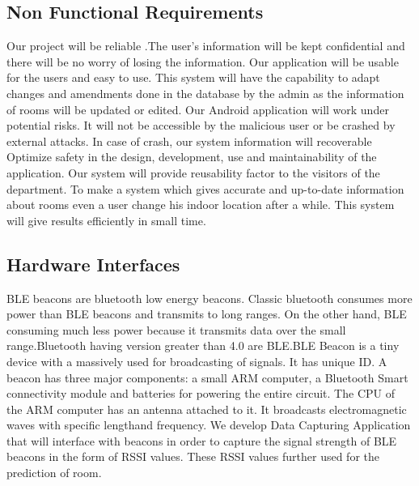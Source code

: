 \documentclass{article}
\begin{document}
\subsection{Non Functional Requirements}
Our project will be reliable .The user’s information will be kept confidential and there will be no worry of losing the information.
Our application will be usable for the users and easy to use.
This system will have the capability to adapt changes and amendments done in the database by the admin as the information of rooms will be updated or edited.
Our Android application will work under potential risks. It will not be accessible by the malicious user or be crashed by external attacks.
In case of crash, our system information will recoverable
Optimize safety in the design, development, use and maintainability of the application.
Our system will provide reusability factor to the visitors of the department.
To make a system which gives accurate and up-to-date information about rooms even a user change his indoor location after a while. This system will give results efficiently in small time.


\subsection{Hardware Interfaces}
BLE beacons are bluetooth low energy beacons. Classic bluetooth consumes more power than BLE beacons and 
transmits to long ranges. On the other hand, BLE consuming much less power because it transmits data over the small range.Bluetooth having version greater than 4.0 are BLE.BLE Beacon is a tiny device with a massively used for broadcasting of signals. It has unique ID. A beacon has three major components: a small ARM computer, a Bluetooth Smart connectivity module and batteries for powering the entire circuit. 
The CPU of the ARM computer has an antenna attached to it. It broadcasts electromagnetic waves with specific lengthand frequency. We develop Data Capturing Application that will interface with beacons in order to capture the signal strength of BLE beacons in the form of RSSI values.
These RSSI values further used for the prediction of room.
\\
\end{document}
